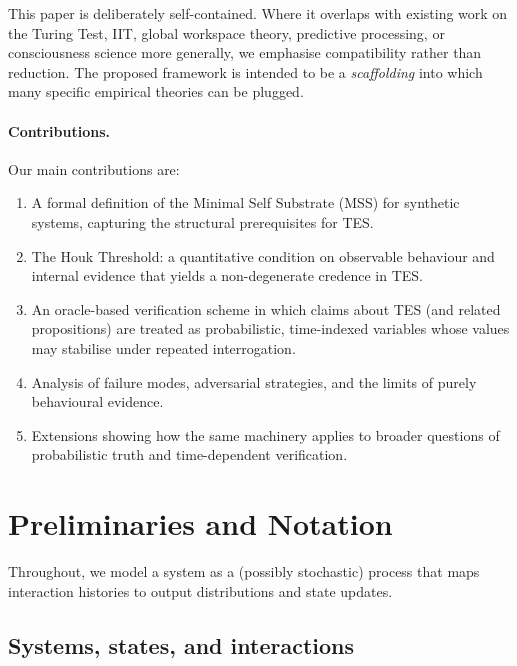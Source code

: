 \documentclass[11pt]{article}
\newcommand{\1}{\mathbf{1}}
\begin{document}
This paper is deliberately self-contained.
Where it overlaps with existing work on the Turing Test, IIT,
global workspace theory, predictive processing, or consciousness science more
generally, we emphasise compatibility rather than reduction.
The proposed framework is intended to be a \emph{scaffolding} into which many
specific empirical theories can be plugged.

\paragraph{Contributions.}
Our main contributions are:

\begin{enumerate}[leftmargin=2em]
  \item A formal definition of the Minimal Self Substrate (MSS) for synthetic
  systems, capturing the structural prerequisites for TES.
  \item The Houk Threshold: a quantitative condition on observable behaviour
  and internal evidence that yields a non-degenerate credence in TES.
  \item An oracle-based verification scheme in which claims about TES (and
  related propositions) are treated as probabilistic, time-indexed variables
  whose values may stabilise under repeated interrogation.
  \item Analysis of failure modes, adversarial strategies, and the limits of
  purely behavioural evidence.
  \item Extensions showing how the same machinery applies to broader questions
  of probabilistic truth and time-dependent verification.
\end{enumerate}

\section{Preliminaries and Notation}

Throughout, we model a system as a (possibly stochastic) process that maps
interaction histories to output distributions and state updates.

\subsection{Systems, states, and interactions}
\end{document}
